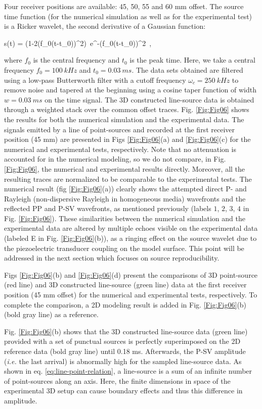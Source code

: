 \documentclass[extra,mreferee]{gji}
\begin{document}
Four receiver positions are available: 45, 50, 55 and 60 mm offset. The source time function (for the numerical simulation as well as for the experimental test) is a Ricker wavelet, the second derivative of a Gaussian function:

\equation
s(t) = (1-2(\pi f_{0}(t-t_{0}))^{2})~e^{-(\pi f_{0}(t-t_{0}))^{2}}~,
\label{eq:ricker-source} 
\endequation

where $f_{0}$ is the central frequency and $t_{0}$ is the peak time. Here, we take a central frequency $f_{0}=100\ kHz$ and $t_{0}=0.03\ ms$. The data sets obtained are filtered using a low-pass Butterworth filter with a cutoff frequency $\omega_{c}=250\ kHz$ to remove noise and tapered at the beginning using a cosine taper function of width $w=0.03\ ms$ on the time signal. The 3D constructed line-source data is obtained through a weighted stack over the common offset traces. Fig. \ref{Fig:Fig06} shows the results for both the numerical simulation and the experimental data. The signals emitted by a line of point-sources and recorded at the first receiver position (45 mm) are presented in Figs \ref{Fig:Fig06}(a) and \ref{Fig:Fig06}(c) for the numerical and experimental tests, respectively. Note that no attenuation is accounted for in the numerical modeling, so we do not compare, in Fig. \ref{Fig:Fig06}, the numerical and experimental results directly. Moreover, all the resulting traces are normalized to be comparable to the experimental tests. The numerical result (fig \ref{Fig:Fig06}(a)) clearly shows the attempted direct P- and Rayleigh (non-dispersive Rayleigh in homogeneous media) wavefronts and the reflected PP and P-SV wavefronts, as mentioned previously (labels $1$, $2$, $3$, $4$ in Fig. \ref{Fig:Fig06}). These similarities between the numerical simulation and the experimental data are altered by multiple echoes visible on the experimental data (labeled E in Fig. \ref{Fig:Fig06}(b)), as a ringing effect on the source wavelet due to the piezoelectric transducer coupling on the model surface. This point will be addressed in the next section which focuses on source reproducibility. 

Figs \ref{Fig:Fig06}(b) and \ref{Fig:Fig06}(d) present the comparisons of 3D point-source (red line) and 3D constructed line-source (green line) data at the first receiver position (45 mm offset) for the numerical and experimental tests, respectively. To complete the comparison, a 2D modeling result is added in Fig. \ref{Fig:Fig06}(b) (bold gray line) as a reference.

Fig. \ref{Fig:Fig06}(b) shows that the 3D constructed line-source data (green line) provided with a set of punctual sources is perfectly superimposed on the 2D reference data (bold gray line) until 0.18 ms. Afterwards, the P-SV amplitude (\textit{i.e.} the last arrival) is abnormally high for the sampled line-source data. As shown in eq. \ref{eq:line-point-relation}, a line-source is a sum of an infinite number of point-sources along an axis. Here, the finite dimensions in space of the experimental 3D setup can cause boundary effects and thus this difference in amplitude.
\end{document}
